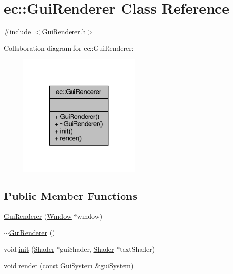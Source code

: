 \hypertarget{classec_1_1_gui_renderer}{}\section{ec\+:\+:Gui\+Renderer Class Reference}
\label{classec_1_1_gui_renderer}


{\ttfamily \#include $<$Gui\+Renderer.\+h$>$}



Collaboration diagram for ec\+:\+:Gui\+Renderer\+:\nopagebreak
\begin{figure}[H]
\begin{center}
\leavevmode
\includegraphics[width=172pt]{classec_1_1_gui_renderer__coll__graph}
\end{center}
\end{figure}
\subsection*{Public Member Functions}
\begin{DoxyCompactItemize}
\item 
\mbox{\hyperlink{classec_1_1_gui_renderer_a2b48bf69434fbc2a4aa47f31a2603e50}{Gui\+Renderer}} (\mbox{\hyperlink{classec_1_1_window}{Window}} $\ast$window)
\item 
\mbox{\hyperlink{classec_1_1_gui_renderer_a0c19871dcb1bed759cae2ab7f2780938}{$\sim$\+Gui\+Renderer}} ()
\item 
void \mbox{\hyperlink{classec_1_1_gui_renderer_a599aa00ab13fda4c9a26221a9359a10f}{init}} (\mbox{\hyperlink{classec_1_1_shader}{Shader}} $\ast$gui\+Shader, \mbox{\hyperlink{classec_1_1_shader}{Shader}} $\ast$text\+Shader)
\item 
void \mbox{\hyperlink{classec_1_1_gui_renderer_af9573af245feb6ab252fb6c060344e7b}{render}} (const \mbox{\hyperlink{classec_1_1_gui_system}{Gui\+System}} \&gui\+System)
\end{DoxyCompactItemize}


